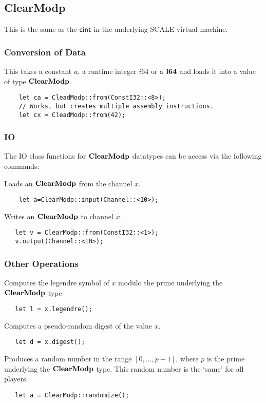 \subsection{ClearModp}
This is the same as the $\mathsf{cint}$ in the underlying SCALE virtual machine.

\subsubsection{Conversion of Data}
This takes a constant $a$, a runtime integer $i64$ or a $\mathbf{i64}$
and loads it into a value of type $\mathbf{ClearModp}$.
\begin{lstlisting}
    let ca = CleadModp::from(ConstI32::<8>);
    // Works, but creates multiple assembly instructions.
    let cx = CleadModp::from(42);
\end{lstlisting}


\subsubsection{IO}
The IO class functions for $\mathbf{ClearModp}$ datatypes can be access via the following commands:

Loads an $\mathbf{ClearModp}$ from the channel $x$.
\begin{lstlisting}
    let a=ClearModp::input(Channel::<10>);
\end{lstlisting}

Writes an $\mathbf{ClearModp}$ to channel $x$.
\begin{lstlisting}
   let v = ClearModp::from(ConstI32::<1>);
   v.output(Channel::<10>);
\end{lstlisting}


\subsubsection{Other Operations}

Computes the legendre symbol of $x$ modulo the prime underlying the
$\mathbf{ClearModp}$ type
\begin{lstlisting}
   let l = x.legendre();
\end{lstlisting}


Computes a pseudo-random digest of the value $x$.
\begin{lstlisting}
   let d = x.digest();
\end{lstlisting}


Produces a random number in the range $[0,\ldots,p-1]$,
where $p$ is the prime underlying the $\mathbf{ClearModp}$ type.
This random number is the `same' for all players.
\begin{lstlisting}
   let a = ClearModp::randomize();
\end{lstlisting}



